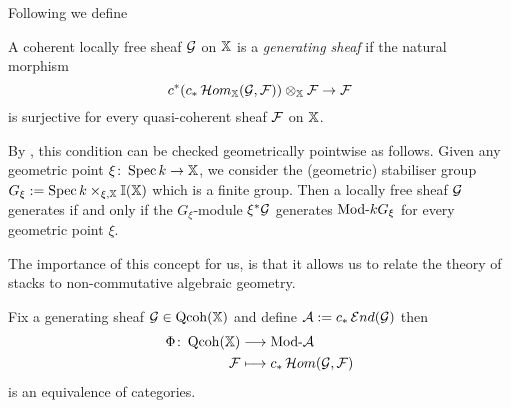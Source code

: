 \documentclass[12pt]{amsart}
\begin{document}
Following \cite{OS} we define
\begin{definition}
A coherent locally free sheaf $\mathcal{G}$ on $\mathbb{X}$ is a {\em generating sheaf} if the natural morphism
$$ c^*(c_*\mathop{{\mathcal{H}}om}\nolimits_{\mathbb{X}}(\mathcal{G}, \mathcal{F})) \otimes_{\mathbb{X}} \mathcal{F} \to \mathcal{F}$$
is surjective for every quasi-coherent sheaf $\mathcal{F}$ on $\mathbb{X}$. 
\end{definition}
By \cite[Theorem~5.2]{OS}, this condition can be checked geometrically pointwise as follows. Given any geometric point $\xi \colon \operatorname{Spec} k \to \mathbb{X}$, we consider the (geometric) stabiliser group $G_{\xi} := \operatorname{Spec} k \times_{\xi, \mathbb{X}} \mathbb{I}(\mathbb{X})$ which is a finite group. Then a locally free sheaf $\mathcal{G}$ generates if and only if the $G_{\xi}$-module $\xi^* \mathcal{G}$ generates $\textup{Mod-} kG_{\xi}$ for every geometric point $\xi$. 


The importance of this concept for us, is that it allows us to relate the theory of stacks to non-commutative algebraic geometry. 
\begin{proposition} \label{prop:Morita}
Fix a generating sheaf $\mathcal{G} \in \operatorname{Qcoh}(\mathbb{X})$ and define $\mathcal{A} := c_* \mathop{{\mathcal{E}}nd}\nolimits (\mathcal{G})$ then 
\begin{align*}
\Phi \colon \operatorname{Qcoh} (\mathbb{X}) &\longrightarrow \textup{Mod-}\mathcal{A} \\
 \mathcal{F} & \longmapsto c_* \mathop{{\mathcal{H}}om}\nolimits(\mathcal{G}, \mathcal{F})
\end{align*}
is an equivalence of categories.
\end{proposition}
\end{document}
